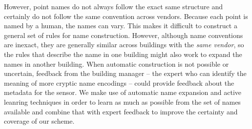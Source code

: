 However, point names do not 
always follow the exact same structure and certainly do not follow the same convention 
across vendors.  Because each
point is named by a human, the names can vary. This makes it difficult to construct a general
set of rules for name construction. However, although name conventions are inexact, they 
are generally similar across buildings with the \emph{same vendor}, so the rules that 
describe the name in one building might also work to expand the names in another building.
When automatic construction is not possible or
uncertain, feedback from the building manager -- the expert who can identify the meaning of 
more cryptic name encodings -- could provide feedback about the metadata for the sensor.
We make use of automatic name expansion and active leanring techniques in order to learn
as much as possible from the set of names available and combine that with expert feedback to
improve the certainty and coverage of our scheme.


